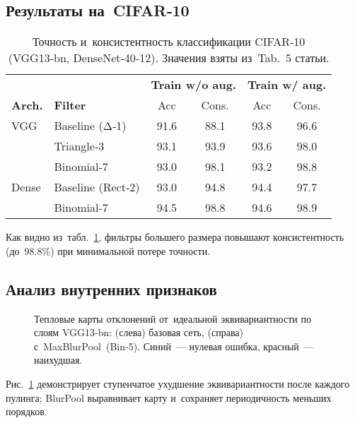 \subsection{Результаты на CIFAR‑10}
\begin{table}[t]
  \centering
  \caption{Точность и консистентность классификации CIFAR‑10 (VGG13‑bn, DenseNet‑40‑12). Значения взяты из Tab.~5 статьи.}
  \label{tab:cifar_results}
  \begin{tabular}{@{}llcccc@{}}
    \toprule
    & & \multicolumn{2}{c}{\bf Train w/o aug.} & \multicolumn{2}{c}{\bf Train w/ aug.}\\
    \cmidrule(lr){3-4} \cmidrule(l){5-6}
    \bf Arch. & \bf Filter & Acc & Cons. & Acc & Cons.\\
    \midrule
    VGG & Baseline (Δ‑1) & 91.6 & 88.1 & 93.8 & 96.6\\
        & Triangle‑3 & 93.1 & 93.9 & 93.6 & 98.0\\
        & Binomial‑7 & 93.0 & 98.1 & 93.2 & 98.8\\
    \addlinespace
    Dense & Baseline (Rect‑2) & 93.0 & 94.8 & 94.4 & 97.7\\
          & Binomial‑7 & 94.5 & 98.8 & 94.6 & 98.9\\
    \bottomrule
  \end{tabular}
\end{table}

Как видно из табл.~\ref{tab:cifar_results}, фильтры большего размера повышают консистентность (до $98.8\%$) при минимальной потере точности.

\subsection{Анализ внутренних признаков}
\begin{figure}[t]
  \centering
  \hfill
  \caption{Тепловые карты отклонений от идеальной эквивариантности по слоям VGG13‑bn: (слева) базовая сеть, (справа) с MaxBlurPool~(Bin‑5). Синий — нулевая ошибка, красный — наихудшая.}
  \label{fig:vgg_heat}
\end{figure}

Рис.~\ref{fig:vgg_heat} демонстрирует ступенчатое ухудшение эквивариантности после каждого пулинга; BlurPool выравнивает карту и сохраняет периодичность меньших порядков.

